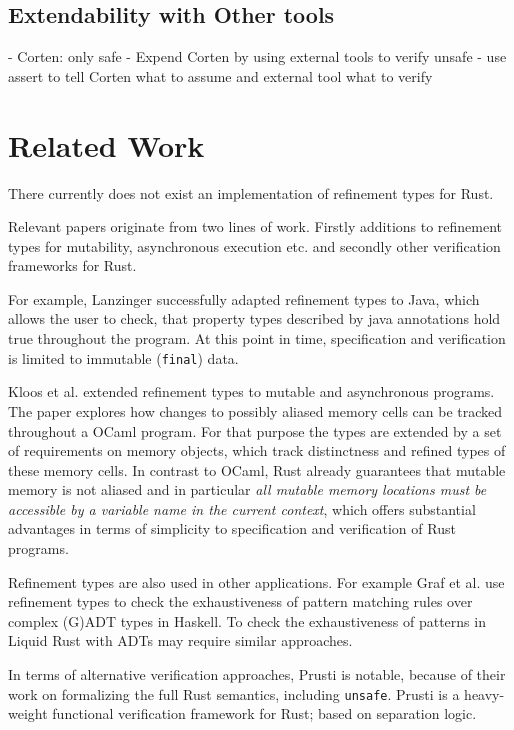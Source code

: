 \documentclass{book}
\newcommand{\code}[1]{\texttt{#1}}
\theoremstyle{definition}
\begin{document}
\section{Extendability with Other tools}

- Corten: only safe
- Expend Corten by using external tools to verify unsafe
- use assert to tell Corten what to assume and external tool what to verify

\chapter{Related Work}

There currently does not exist an implementation of refinement types for Rust.

Relevant papers originate from two lines of work. Firstly additions to refinement types for mutability, asynchronous execution etc. and secondly other verification frameworks for Rust.

For example, Lanzinger \cite{lanzinger_property_2021} successfully adapted refinement types to Java, which allows the user to check, that property types described by java annotations hold true throughout the program. At this point in time, specification and verification is limited to immutable (\code{final}) data.

Kloos et al. \cite{kloos_asynchronous_2015} extended refinement types to mutable and asynchronous programs. The paper explores how changes to possibly aliased memory cells can be tracked throughout a OCaml program. For that purpose the types are extended by a set of requirements on memory objects, which track distinctness and refined types of these memory cells. In contrast to OCaml, Rust already guarantees that mutable memory is not aliased and in particular \textit{all mutable memory locations must be accessible by a variable name in the current context}, which offers substantial advantages in terms of simplicity to specification and verification of Rust programs.

Refinement types are also used in other applications. For example Graf et al. \cite{graf_lower_2020} use refinement types to check the exhaustiveness of pattern matching rules over complex (G)ADT types in Haskell. To check the exhaustiveness of patterns in Liquid Rust with ADTs may require similar approaches.

In terms of alternative verification approaches, Prusti\cite{astrauskas_leveraging_2019} is notable, because of their work on formalizing the full Rust semantics, including \code{unsafe}. Prusti is a heavy-weight functional verification framework for Rust; based on separation logic.
\end{document}
